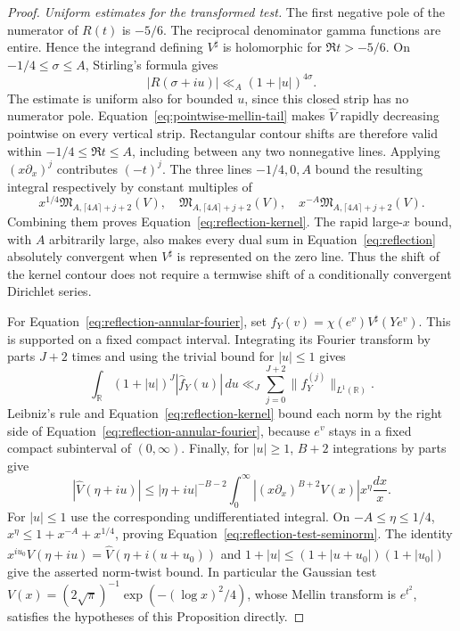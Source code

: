 \documentclass[11pt,a4paper]{article}
\numberwithin{equation}{section}
\numberwithin{figure}{section}
\theoremstyle{definition}
\theoremstyle{remark}
\begin{document}
\begin{proof}
\emph{Uniform estimates for the transformed test.}
The first negative pole of the numerator of $R(t)$ is $-5/6$.
The reciprocal denominator gamma functions are entire.  Hence the
integrand defining $V^\sharp$ is holomorphic for $\Re t>-5/6$.
On $-1/4\le\sigma\le A$, Stirling's formula gives
\[
 |R(\sigma+iu)|\ll_A(1+|u|)^{4\sigma}.
\]
The estimate is uniform also for bounded $u$, since this closed strip
has no numerator pole.  Equation~\eqref{eq:pointwise-mellin-tail} makes
$\widehat V$ rapidly decreasing pointwise on every vertical strip.  Rectangular
contour shifts are therefore valid within $-1/4\le\Re t\le A$,
including between any two nonnegative lines.  Applying
$(x\partial_x)^j$ contributes $(-t)^j$.  The three lines
$-1/4,0,A$ bound the resulting integral respectively by constant
multiples of
\[
 x^{1/4}\mathfrak M_{A,\lceil4A\rceil+j+2}(V),\quad
 \mathfrak M_{A,\lceil4A\rceil+j+2}(V),\quad
 x^{-A}\mathfrak M_{A,\lceil4A\rceil+j+2}(V).
\]
Combining them proves Equation~\eqref{eq:reflection-kernel}.
The rapid large-$x$ bound, with $A$ arbitrarily large, also makes every
dual sum in Equation~\eqref{eq:reflection} absolutely convergent when
$V^\sharp$ is represented on the zero line.  Thus the shift of the
kernel contour does not require a termwise shift of a conditionally
convergent Dirichlet series.

For Equation~\eqref{eq:reflection-annular-fourier}, set
$f_Y(v)=\chi(e^v)V^\sharp(Ye^v)$.  This is supported on a fixed compact
interval.  Integrating its Fourier transform by parts $J+2$ times
and using the trivial bound for $|u|\le1$ gives
\[
 \int_{\mathbb R}(1+|u|)^J|\widehat f_Y(u)|\,du
 \ll_J\sum_{j=0}^{J+2}\|f_Y^{(j)}\|_{L^1(\mathbb R)}.
\]
Leibniz's rule and Equation~\eqref{eq:reflection-kernel} bound each
norm by the right side of Equation~\eqref{eq:reflection-annular-fourier},
because $e^v$ stays in a fixed compact subinterval of $(0,\infty)$.
Finally, for $|u|\ge1$, $B+2$ integrations by parts give
\[
 |\widehat V(\eta+iu)|
 \le |\eta+iu|^{-B-2}
       \int_0^\infty|(x\partial_x)^{B+2}V(x)|x^\eta\frac{dx}{x}.
\]
For $|u|\le1$ use the corresponding undifferentiated integral.
On $-A\le\eta\le1/4$,
$x^\eta\le1+x^{-A}+x^{1/4}$, proving
Equation~\eqref{eq:reflection-test-seminorm}.  The identity
$\widehat{x^{iu_0}V}(\eta+iu)=\widehat V(\eta+i(u+u_0))$
and $1+|u|\le(1+|u+u_0|)(1+|u_0|)$ give the asserted norm-twist
bound.  In particular the Gaussian test
$V(x)=(2\sqrt\pi)^{-1}\exp(- (\log x)^2/4)$, whose Mellin transform is
$e^{t^2}$, satisfies the hypotheses of this Proposition directly.
\end{proof}
\end{document}
